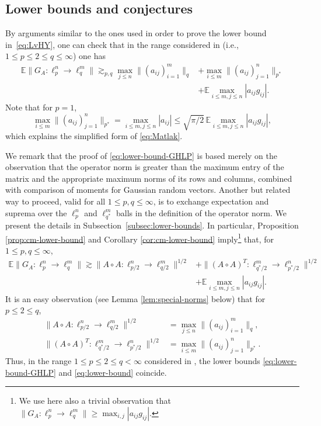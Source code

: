 \documentclass[a4paper]{amsart}
\theoremstyle{definition}
\theoremstyle{remark}
\numberwithin{equation}{section}
\newcommand*{\EE}{\mathbb{E}}
\newcommand*{\hadprod}{\mathbin{\circ}} %
\begin{document}
\subsection{Lower bounds and conjectures}\label{subsect:conjectures}

By arguments similar to the ones used in order to prove the lower bound in~\eqref{eq:LvHY}, one can check that in the range considered in \cite{GHLP,Matlak} (i.e., $1\leq p\leq 2\leq q \leq \infty$) one has
\begin{align}
\label{eq:lower-bound-GHLP}
 \EE \|G_A\colon \ell_{p}^n\to\ell_q^m\|
 \gtrsim_{p,q}
\max_{j \leq n}\|(a_{ij})_{i=1}^m\|_q &+ \max_{i \leq m}\|(a_{ij})_{j=1}^n\|_{p^*} \\
&+ \EE\max_{i\leq m, j\leq n}|a_{ij}g_{ij}|. \nonumber
\end{align}
Note that for $p=1$,
\begin{displaymath}
\max_{i \leq m}\|(a_{ij})_{j=1}^n\|_{p^*} = \max_{i\le m,j\le n} |a_{ij}| \le \sqrt{\pi/2}\,\EE\max_{i\leq m, j\leq n}|a_{ij}g_{ij}|,
\end{displaymath}
which explains the simplified form of \eqref{eq:Matlak}.

We remark that the proof of \eqref{eq:lower-bound-GHLP} is based merely on the observation that the operator norm is greater than the maximum entry of the matrix and the appropriate maximum norms of its rows and columns, combined with comparison of moments for Gaussian random vectors. Another but related way to proceed, valid for all $1 \le p, q \le \infty$, is to exchange expectation and suprema over the $\ell_p^n$ and $\ell_{q^\ast}^m$ balls in the definition of the operator norm.
 We present the details in Subsection~\ref{subsec:lower-bounds}.
In particular, Proposition \ref{prop:cm-lower-bound} and Corollary \ref{cor:cm-lower-bound} imply\footnote{We use here also a trivial observation that $\|G_A\colon \ell_{p}^n\to\ell_q^m\| \ge \max_{i,j} |a_{ij}g_{ij}|$.} that, for $1\le p,q \le \infty$,
\begin{align}
\EE \|G_A\colon \ell_{p}^n\to\ell_q^m\| \gtrsim  \|A\hadprod A \colon \ell^n_{p/2} \to \ell^m_{q/2} \|^{1/2} &+ \|(A\hadprod A)^T \colon \ell^m_{q^*/2} \to \ell^n_{p^*/2}\|^{1/2} \nonumber\\
&+ \EE\max_{i\leq m, j\leq n}|a_{ij}g_{ij}|.
\label{eq:lower-bound}
\end{align}
It is an easy observation (see Lemma \ref{lem:special-norms} below) that for  $p\le 2 \le q$,
\begin{equation}
\label{eq:display-after-1.8}
\begin{split}
\|A\hadprod A \colon \ell^n_{p/2} \to \ell^m_{q/2} \|^{1/2}  &= \max_{j \leq n}\|(a_{ij})_{i=1}^m\|_q, \\
\|(A\hadprod A)^T \colon \ell^m_{q^*/2} \to \ell^n_{p^*/2}\|^{1/2}  &= \max_{i \leq m}\|(a_{ij})_{j=1}^n\|_{p^\ast}.
\end{split}
\end{equation}
Thus, in the range $1 \le  p \le 2 \le q < \infty$ considered in \cite{GHLP,Matlak}, the lower bounds \eqref{eq:lower-bound-GHLP} and \eqref{eq:lower-bound} coincide.
\end{document}
